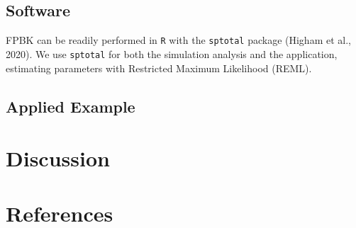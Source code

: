 \documentclass[]{elsarticle} %
\begin{document}
\hypertarget{software}{%
\subsection{Software}\label{software}}

FPBK can be readily performed in \texttt{R} with the \texttt{sptotal}
package (Higham et al., 2020). We use \texttt{sptotal} for both the
simulation analysis and the application, estimating parameters with
Restricted Maximum Likelihood (REML).

\hypertarget{applied-example}{%
\subsection{Applied Example}\label{applied-example}}

\hypertarget{sec:discussion}{%
\section{Discussion}\label{sec:discussion}}

\hypertarget{references}{%
\section*{References}\label{references}}
\end{document}
